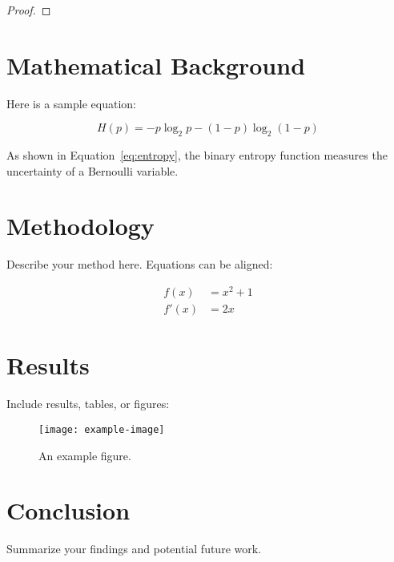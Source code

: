 \documentclass[12pt]{article}
\begin{document}
\begin{proof}

\end{proof}

\section{Mathematical Background}

Here is a sample equation:

\begin{equation}
H(p) = -p \log_2 p - (1 - p) \log_2(1 - p)
\label{eq:entropy}
\end{equation}

As shown in Equation~\ref{eq:entropy}, the binary entropy function measures the uncertainty of a Bernoulli variable.

\section{Methodology}

Describe your method here. Equations can be aligned:

\begin{align}
f(x) &= x^2 + 1 \\
f'(x) &= 2x
\end{align}

\section{Results}

Include results, tables, or figures:

\begin{figure}[h]
\centering
\texttt{[image: example-image]}
\caption{An example figure.}
\label{fig:example}
\end{figure}

\section{Conclusion}

Summarize your findings and potential future work.

\printbibliography
\end{document}
